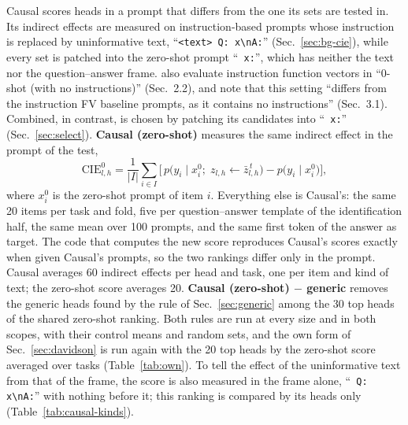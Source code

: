 \documentclass[10pt,a4paper]{article}
\newcommand{\nl}{\textbackslash n}
\newcommand{\p}[1]{``\texttt{#1}''}
\newcommand{\zbar}{\bar z}
\begin{document}
Causal scores heads in a prompt that differs from the one its sets are tested in. Its indirect effects are measured on instruction-based prompts whose instruction is replaced by uninformative text, \p{<text> Q: x\nl A:} (Sec.~\ref{sec:bg-cie}), while every set is patched into the zero-shot prompt \p{ x:}, which has neither the text nor the question--answer frame. \citet{davidson2025different} also evaluate instruction function vectors in ``0-shot (with no instructions)'' (Sec.~2.2), and note that this setting ``differs from the instruction FV baseline prompts, as it contains no instructions'' (Sec.~3.1). Combined, in contrast, is chosen by patching its candidates into \p{ x:} (Sec.~\ref{sec:select}). \textbf{Causal (zero-shot)} measures the same indirect effect in the prompt of the test,
\begin{equation}
\mathrm{CIE}^{0}_{l,h} = \frac{1}{|I|}\sum_{i\in I}\Big[\, p\big(y_i \mid x^{0}_i;\; z_{l,h}\leftarrow \zbar^{\,t}_{l,h}\big) - p\big(y_i \mid x^{0}_i\big) \Big],
\end{equation}
where $x^{0}_i$ is the zero-shot prompt of item $i$. Everything else is Causal's: the same 20 items per task and fold, five per question--answer template of the identification half, the same mean over 100 prompts, and the same first token of the answer as target. The code that computes the new score reproduces Causal's scores exactly when given Causal's prompts, so the two rankings differ only in the prompt. Causal averages 60 indirect effects per head and task, one per item and kind of text; the zero-shot score averages 20. \textbf{Causal (zero-shot) $-$ generic} removes the generic heads found by the rule of Sec.~\ref{sec:generic} among the 30 top heads of the shared zero-shot ranking. Both rules are run at every size and in both scopes, with their control means and random sets, and the own form of Sec.~\ref{sec:davidson} is run again with the 20 top heads by the zero-shot score averaged over tasks (Table~\ref{tab:own}). To tell the effect of the uninformative text from that of the frame, the score is also measured in the frame alone, \p{ Q: x\nl A:} with nothing before it; this ranking is compared by its heads only (Table~\ref{tab:causal-kinds}).

\begin{table}[tbp]
\centering\small

\caption{The causal score by the prompt it is measured in. Share of the top $N$ heads that the score on one half of the items has in common with the score on the other half: per task, mean over the 14 tasks; shared, within-task ranks averaged over tasks. Same prompt: each prompt's stability. Different prompts: mean over both directions and, for other tasks' instructions, over the two kinds it is compared with. Top-20 effect: mean of the 20 largest indirect effects of a task, an increase in the probability of the answer's first token, averaged over tasks and halves. 20 items per task and half.}
\label{tab:causal-kinds}
\end{table}
\end{document}
